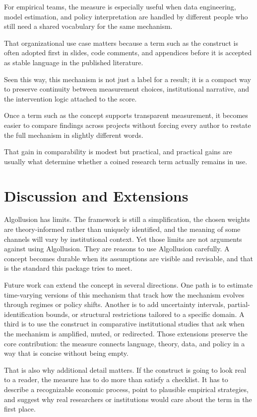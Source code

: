 \documentclass[12pt]{article}
\begin{document}
For empirical teams, the measure is especially useful when data engineering, model estimation, and policy interpretation are handled by different people who still need a shared vocabulary for the same mechanism.

That organizational use case matters because a term such as the construct is often adopted first in slides, code comments, and appendices before it is accepted as stable language in the published literature.

Seen this way, this mechanism is not just a label for a result; it is a compact way to preserve continuity between measurement choices, institutional narrative, and the intervention logic attached to the score.

Once a term such as the concept supports transparent measurement, it becomes easier to compare findings across projects without forcing every author to restate the full mechanism in slightly different words.

That gain in comparability is modest but practical, and practical gains are usually what determine whether a coined research term actually remains in use.

\section{Discussion and Extensions}
Algollusion has limits. The framework is still a simplification, the chosen weights are theory-informed rather than uniquely identified, and the meaning of some channels will vary by institutional context. Yet those limits are not arguments against using Algollusion. They are reasons to use Algollusion carefully. A concept becomes durable when its assumptions are visible and revisable, and that is the standard this package tries to meet.

Future work can extend the concept in several directions. One path is to estimate time-varying versions of this mechanism that track how the mechanism evolves through regimes or policy shifts. Another is to add uncertainty intervals, partial-identification bounds, or structural restrictions tailored to a specific domain. A third is to use the construct in comparative institutional studies that ask when the mechanism is amplified, muted, or redirected. Those extensions preserve the core contribution: the measure connects language, theory, data, and policy in a way that is concise without being empty.

That is also why additional detail matters. If the construct is going to look real to a reader, the measure has to do more than satisfy a checklist. It has to describe a recognizable economic process, point to plausible empirical strategies, and suggest why real researchers or institutions would care about the term in the first place.
\end{document}
